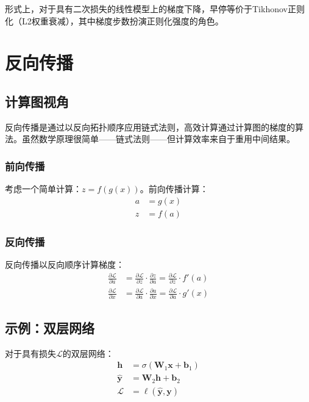 形式上，对于具有二次损失的线性模型上的梯度下降，早停等价于Tikhonov正则化（L2权重衰减），其中梯度步数扮演正则化强度的角色。

\section{反向传播}

\subsection{计算图视角}

反向传播是通过以反向拓扑顺序应用链式法则，高效计算通过计算图的梯度的算法。虽然数学原理很简单——链式法则——但计算效率来自于重用中间结果。

\subsubsection{前向传播}

考虑一个简单计算：$z = f(g(x))$。前向传播计算：
\begin{align}
a &= g(x) \\
z &= f(a)
\end{align}

\subsubsection{反向传播}

反向传播以反向顺序计算梯度：
\begin{align}
\frac{\partial \mathcal{L}}{\partial a} &= \frac{\partial \mathcal{L}}{\partial z} \cdot \frac{\partial z}{\partial a} = \frac{\partial \mathcal{L}}{\partial z} \cdot f'(a) \\
\frac{\partial \mathcal{L}}{\partial x} &= \frac{\partial \mathcal{L}}{\partial a} \cdot \frac{\partial a}{\partial x} = \frac{\partial \mathcal{L}}{\partial a} \cdot g'(x)
\end{align}

\subsection{示例：双层网络}

对于具有损失$\mathcal{L}$的双层网络：
\begin{align}
\mathbf{h} &= \sigma(\mathbf{W}_1 \mathbf{x} + \mathbf{b}_1) \\
\hat{\mathbf{y}} &= \mathbf{W}_2 \mathbf{h} + \mathbf{b}_2 \\
\mathcal{L} &= \ell(\hat{\mathbf{y}}, \mathbf{y})
\end{align}

